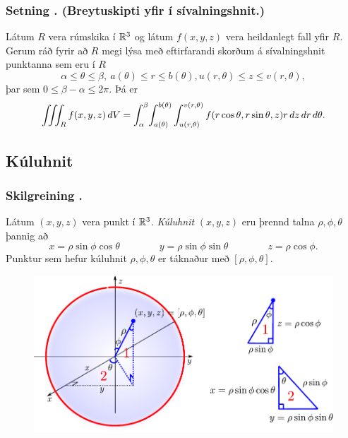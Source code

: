 \subsubsection{Setning \kaflanr. (Breytuskipti yfir í sívalningshnit.)}

Látum $R$ vera rúmskika í ${\mathbb R}^3$ og látum $f(x,y,z)$ vera heildanlegt fall yfir $R$.  Gerum ráð fyrir að $R$ megi lýsa með eftirfarandi skorðum á sívalningshnit punktanna sem eru í $R$
$$\alpha\leq \theta\leq \beta,\ a(\theta)\leq r\leq  b(\theta), u(r,\theta)\leq z\leq v(r,\theta),$$ 
þar sem $0\leq \beta-\alpha\leq 2\pi$.  Þá er
$$\int\!\!\!\int\!\!\!\int_R f(x,y,z)\,dV= 
\int_\alpha^\beta
\!\int_{a(\theta)}^{b(\theta)}\int_{u(r,\theta)}^{v(r,\theta)}      
f(r\cos\theta,r\sin\theta,z)r\,dz\,dr\,d\theta.$$
 



\subsection{Kúluhnit} 

\subsubsection{Skilgreining \kaflanr.}
 Látum $(x,y,z)$ vera punkt í ${\mathbb R}^3$.  {\em Kúluhnit} $(x,y,z)$ eru þrennd talna $\rho, \phi, \theta$ þannig að 
$$x=\rho\sin\phi\cos\theta\qquad\qquad y=\rho\sin\phi\sin\theta\qquad\qquad z=\rho\cos\phi.$$
Punktur sem hefur kúluhnit $\rho, \phi, \theta$ er táknaður 
með $[\rho, \phi, \theta]$. 

\begin {figure}[h!]
 \centering
            \includegraphics[width=0.75\linewidth]{sphere}
            \caption*{}
\end {figure}



